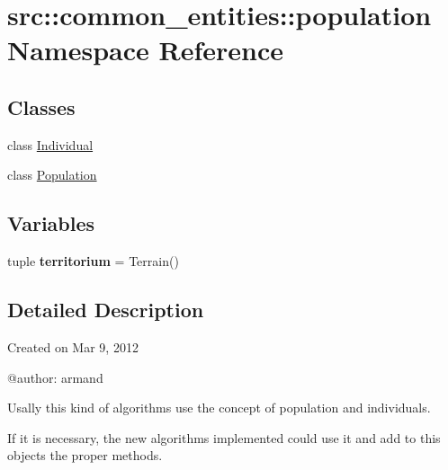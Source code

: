 \hypertarget{namespacesrc_1_1common__entities_1_1population}{
\section{src::common\_\-entities::population Namespace Reference}
\label{namespacesrc_1_1common__entities_1_1population}
}
\subsection*{Classes}
\begin{DoxyCompactItemize}
\item 
class \hyperlink{classsrc_1_1common__entities_1_1population_1_1Individual}{Individual}
\item 
class \hyperlink{classsrc_1_1common__entities_1_1population_1_1Population}{Population}
\end{DoxyCompactItemize}
\subsection*{Variables}
\begin{DoxyCompactItemize}
\item 
\hypertarget{namespacesrc_1_1common__entities_1_1population_a94511b345b803ee161e8f4e52547ee74}{
tuple {\bfseries territorium} = Terrain()}
\label{namespacesrc_1_1common__entities_1_1population_a94511b345b803ee161e8f4e52547ee74}

\end{DoxyCompactItemize}


\subsection{Detailed Description}
\begin{DoxyVerb}
Created on Mar 9, 2012

@author: armand

Usally this kind of algorithms use the concept of population and individuals.

If it is necessary, the new algorithms implemented could use it and add to this
objects the proper methods.

\end{DoxyVerb}
 